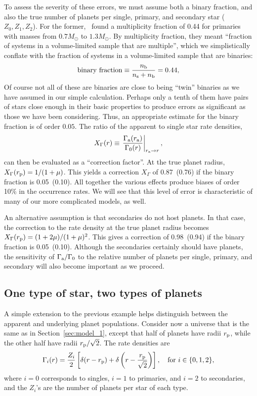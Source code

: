 \documentclass[12pt,modern]{aastex61}
\renewcommand{\a}{_{\rm a}}
\newcommand{\s}{_{\rm s}}
\newcommand{\p}{_{\rm p}}
\renewcommand{\b}{_{\rm b}}
\begin{document}
To assess the severity of these errors, we must assume both a binary fraction, 
and also the true number of planets per single, primary, and secondary star 
($Z_0,Z_1,Z_2$).
For the former,~\citet{raghavan_survey_2010} found a multiplicity 
fraction of 0.44 for primaries with masses from $0.7M_\odot$ to $1.3M_\odot$.
By multiplicity fraction, they meant ``fraction of systems in a volume-limited 
sample that are multiple'', which we simplistically conflate with the
fraction of systems in a volume-limited sample that are binaries:
\begin{equation}
{\rm binary\ fraction} \equiv \frac{n\b}{n\s + n\b} = 0.44,
\end{equation}
Of course not all of these are binaries are close to being ``twin'' binaries 
as we have assumed in our simple calculation.
Perhaps only a tenth of them have pairs of stars close enough
in their basic properties to produce errors as significant as those
we have been considering.  Thus, an appropriate estimate
for the binary fraction is of order $0.05$.
The ratio of the apparent to single star rate densities,
\begin{equation}
X_\Gamma(r) \equiv \left. \frac{\Gamma\a(r\a)}{\Gamma_0(r)} \right|_{r\a 
    \rightarrow r},
\end{equation}
can then be evaluated as a ``correction factor''.
At the true planet radius, $X_\Gamma(r\p)=1/(1+\mu)$.
This yields a correction $X_\Gamma$ of 0.87~(0.76) if the binary fraction is 
0.05~(0.10).
All together the various effects produce biases of order 10\% in the
occurrence rates.  We will see that this level of error is characteristic
of many of our more complicated models, as well.

An alternative assumption is that secondaries do not host planets. In that 
case, the correction to the rate density at the true planet radius becomes 
$X_\Gamma(r\p) = (1+2\mu)/(1+\mu)^2$.
This gives a correction of 0.98~(0.94) if the binary fraction is 0.05~(0.10).
Although the secondaries certainly should have planets, 
the sensitivity of $\Gamma\a/\Gamma_0$ to the relative number of
planets per single, primary, and secondary will also become important
as we proceed.

\subsection{One type of star, two types of planets}

A simple extension to the previous example helps distinguish 
between the apparent and underlying planet populations.
Consider now a universe that is the same as in
Section~\ref{sec:model_1}, except that half of planets have radii $r\p$, 
while the other half have radii $r\p/\sqrt{2}$.
The rate densities are
\begin{equation}
\Gamma_i(r) = \frac{Z_i}{2} \left[
\delta(r-r\p) + \delta\left(r-\frac{r\p}{\sqrt{2}}\right)
\right], \quad {\rm for}\  i \in \{ 0,1,2 \},
\end{equation}
where $i=0$ corresponds to singles, $i=1$ to primaries, and $i=2$ to
secondaries, and the $Z_i$'s are the number of planets per star of
each type.
\end{document}
